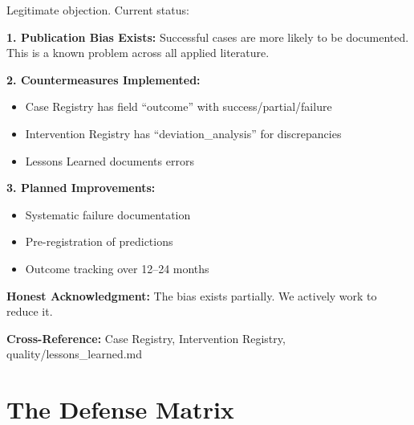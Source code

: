 \begin{axiom}
Legitimate objection. Current status:

\textbf{1. Publication Bias Exists:}
Successful cases are more likely to be documented.
This is a known problem across all applied literature.

\textbf{2. Countermeasures Implemented:}
\begin{itemize}[nosep]
    \item Case Registry has field ``outcome'' with success/partial/failure
    \item Intervention Registry has ``deviation\_analysis'' for discrepancies
    \item Lessons Learned documents errors
\end{itemize}

\textbf{3. Planned Improvements:}
\begin{itemize}[nosep]
    \item Systematic failure documentation
    \item Pre-registration of predictions
    \item Outcome tracking over 12--24 months
\end{itemize}

\textbf{Honest Acknowledgment:} The bias exists partially. We actively work to reduce it.
\end{axiom}

\textbf{Cross-Reference:} Case Registry, Intervention Registry, quality/lessons\_learned.md

\section{The Defense Matrix}
\label{sec:da-matrix}

